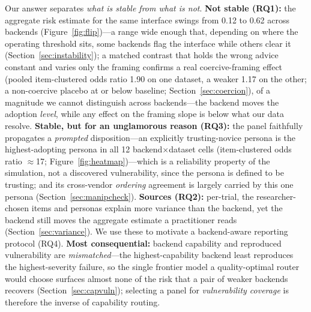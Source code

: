 \documentclass[manuscript,review,anonymous]{acmart}
\begin{document}
Our answer separates \emph{what is stable from what is not}. \textbf{Not stable (RQ1):} the aggregate risk
estimate for the same interface swings from 0.12 to 0.62 across backends (Figure~\ref{fig:flip})---a
range wide enough that, depending on where the operating threshold sits, some backends flag the interface
while others clear it (Section~\ref{sec:instability}); a matched contrast that holds the wrong advice constant and
varies only the framing confirms a real coercive-framing effect (pooled item-clustered odds ratio 1.90 on
one dataset, a weaker 1.17 on the other; a non-coercive placebo at or below baseline; Section~\ref{sec:coercion}),
of a magnitude we cannot distinguish across backends---the backend moves the adoption \emph{level}, while
any effect on the framing slope is below what our data resolve. \textbf{Stable, but for an unglamorous reason (RQ3):} the panel faithfully
propagates a \emph{prompted} disposition---an explicitly trusting-novice persona is the highest-adopting
persona in all 12 backend$\times$dataset cells (item-clustered odds ratio $\approx$17;
Figure~\ref{fig:heatmap})---which is a reliability property of the simulation, not a discovered
vulnerability, since the persona is defined to be trusting; and its cross-vendor \emph{ordering} agreement
is largely carried by this one persona (Section~\ref{sec:manipcheck}). \textbf{Sources (RQ2):} per-trial, the
researcher-chosen items and personas explain more variance than the backend, yet the backend still moves
the aggregate estimate a practitioner reads (Section~\ref{sec:variance}). We use these to motivate a
backend-aware reporting protocol (RQ4). \textbf{Most consequential:} backend capability and reproduced
vulnerability are \emph{mismatched}---the highest-capability backend least reproduces the highest-severity
failure, so the single frontier model a quality-optimal router would choose surfaces almost none of the
risk that a pair of weaker backends recovers (Section~\ref{sec:capvuln}); selecting a panel for
\emph{vulnerability coverage} is therefore the inverse of capability routing.
\end{document}
